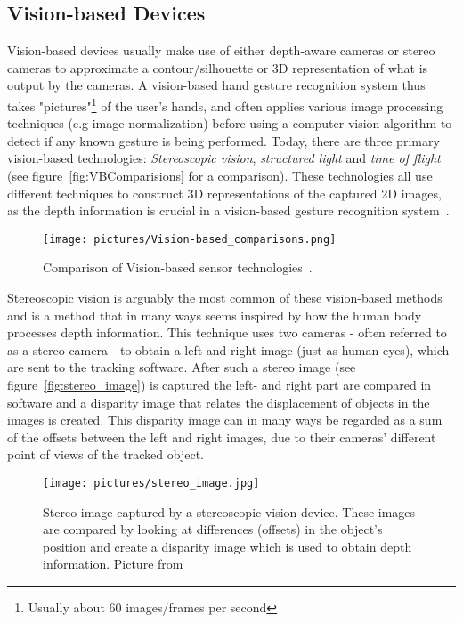 \subsection{Vision-based Devices} 
Vision-based devices usually make use of either depth-aware cameras or stereo cameras to approximate a contour/silhouette or 
3D representation of what is output by the cameras. A vision-based hand gesture recognition system thus takes "pictures"\footnote{Usually about 60 images/frames per second} of the 
user's hands, and often applies various image processing techniques (e.g image normalization) before using a computer vision algorithm to detect if any known gesture is 
being performed. Today, there are three primary vision-based technologies: \textit{Stereoscopic vision}, \textit{structured light} and 
\textit{time of flight}~\citep{Ko2012} (see figure~\vref{fig:VBComparisions} for a comparison). 
These technologies all use different techniques to construct 3D representations of the captured 2D images, as the 
depth information is crucial in a vision-based gesture recognition system~\citep{Ko2012}.

\begin{figure}%
	\texttt{[image: pictures/Vision-based\_comparisons.png]}
	\caption{Comparison of Vision-based sensor technologies~\citep{Ko2012}.}
	\label{fig:VBComparisions}
\end{figure} 

Stereoscopic vision is arguably the most common of these vision-based methods and is a method that in many ways seems inspired by how the human body processes depth information.
This technique uses two cameras - often referred to as a stereo camera - to obtain a left and right image (just as human eyes), which are sent to
the tracking software. After such a stereo image (see figure~\vref{fig:stereo_image}) is captured the left- and right part are compared in software and a disparity image that relates the 
displacement of objects in the images is created. This disparity image can in many ways be regarded as a sum of the offsets between the left and right images,
due to their cameras' different point of views of the tracked object. 

\begin{figure}%
	\texttt{[image: pictures/stereo\_image.jpg]}
	\caption[Stereo image captured by a stereoscopic vision device]{Stereo image captured by a stereoscopic vision device. These images are compared by looking at differences
	(offsets) in the object's position and create a disparity image which is used to obtain depth information. Picture from \citet{LeapMotion2016}}
	\label{fig:stereo_image}
\end{figure} 

